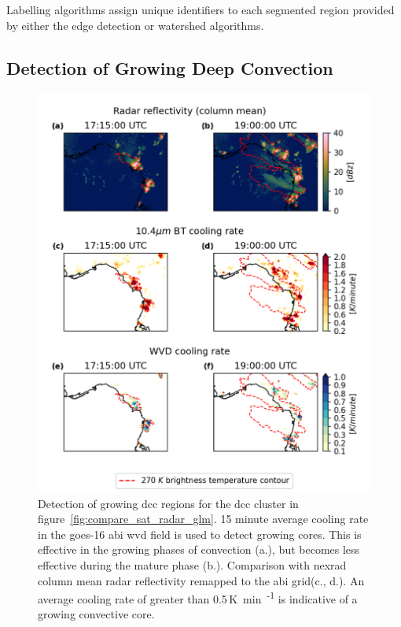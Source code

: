 Labelling algorithms assign unique identifiers to each segmented region provided by either the edge detection or watershed algorithms.

\subsection{Detection of Growing Deep Convection}

\begin{figure}[t]
    \includegraphics[width=\textwidth]{figures/chapter1_16.png}
    \caption[
    Detection of growing \acrshort{dcc} regions for the \acrshort{dcc} cluster in figure~\ref{fig:compare_sat_radar_glm}
    ]{
    Detection of growing \acrshort{dcc} regions for the \acrshort{dcc} cluster in figure~\ref{fig:compare_sat_radar_glm}. 15 minute average cooling rate in the \acrshort{goes}-16 \acrshort{abi} \acrshort{wvd} field is used to detect growing cores. This is effective in the growing phases of convection (a.), but becomes less effective during the mature phase (b.). Comparison with \acrshort{nexrad} column mean radar reflectivity remapped to the \acrshort{abi} grid(c., d.). An average cooling rate of greater than 0.5\,\unit{K min\textsuperscript{-1}} is indicative of a growing convective core.
    }
    \label{fig:core_detection}
\end{figure}

